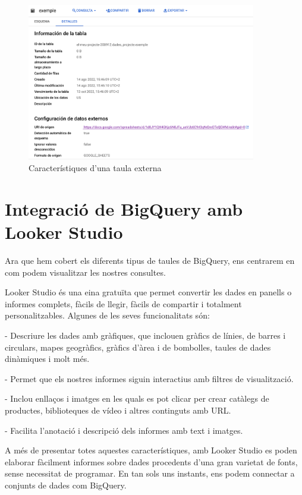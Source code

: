 \documentclass[12pt,longbibliography]{article}
\theoremstyle{definition}
\theoremstyle{remark}
\begin{document}
\begin{figure}[h!]
\begin{center}
\includegraphics[width=10cm]{bq25}
\end{center}
\caption{Característiques d'una taula externa}
\label{fig:bq25}
\end{figure}


\newpage

\section{Integració de BigQuery amb Looker Studio}

Ara que hem cobert els diferents tipus de taules de BigQuery, ens centrarem en com podem visualitzar les nostres consultes. 


Looker Studio és una eina gratuïta que permet convertir les dades en panells o informes complets, fàcils de llegir, fàcils de compartir i totalment personalitzables. Algunes de les seves funcionalitats són:


- Descriure les dades amb gràfiques, que inclouen gràfics de línies, de barres i circulars, mapes geogràfics, gràfics d’àrea i de bombolles, taules de dades dinàmiques i molt més.


- Permet que els nostres informes siguin interactius amb filtres de visualització.


- Inclou enllaços i imatges en les quals es pot clicar per crear catàlegs de productes, biblioteques de vídeo i altres continguts amb URL.


- Facilita l’anotació i descripció dels informes amb text i imatges.


A més de presentar totes aquestes característiques, amb Looker Studio es poden elaborar fàcilment informes sobre dades procedents d’una gran varietat de fonts, sense necessitat de programar. En tan sols uns instants, ens podem connectar a conjunts de dades com BigQuery.
\end{document}

